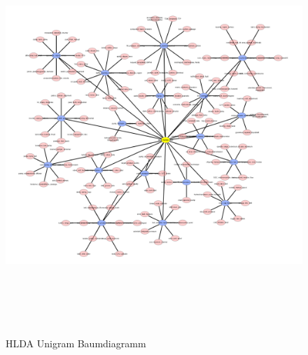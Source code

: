 \begin{figure}[htpb]
	\centering
	\includegraphics[height=15cm,width=\textwidth,keepaspectratio=true]{img/tree.png}
	\caption{
		HLDA Unigram Baumdiagramm
	}
	\label{fig:HLDA_Unigram_Baum}
\end{figure}



